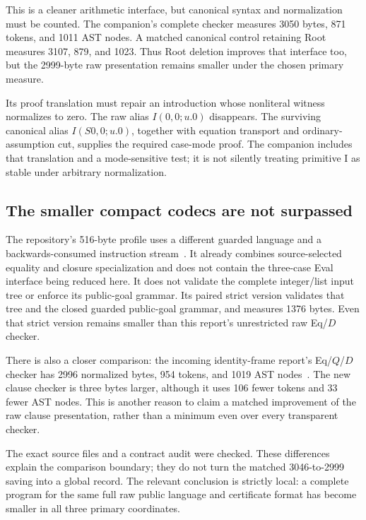 \documentclass[11pt,letterpaper]{article}
\theoremstyle{definition}
\begin{document}
This is a cleaner arithmetic interface, but canonical syntax
and normalization must be counted. The companion's complete
checker measures 3050 bytes, 871 tokens, and 1011 AST nodes.
A matched canonical control retaining Root measures 3107,
879, and 1023. Thus Root deletion improves that interface too,
but the 2999-byte raw presentation remains smaller under the
chosen primary measure.

Its proof translation must repair an introduction whose
nonliteral witness normalizes to zero. The raw alias
$I(0,0;u.0)$ disappears. The surviving canonical alias
$I(S0,0;u.0)$, together with equation transport and
ordinary-assumption cut, supplies the required case-mode proof.
The companion includes that translation and a mode-sensitive
test; it is not silently treating primitive I as stable under
arbitrary normalization.

\subsection{The smaller compact codecs are not surpassed}

The repository's 516-byte profile uses a different guarded
language and a backwards-consumed instruction stream~\cite{compact}. It
already combines source-selected equality and closure
specialization and does not contain the three-case Eval
interface being reduced here. It does not validate the complete
integer/list input tree or enforce its public-goal grammar.
Its paired strict version validates that tree and the closed
guarded public-goal grammar, and measures 1376 bytes.
Even that strict version remains smaller than this report's
unrestricted raw Eq/$D$ checker.

There is also a closer comparison: the incoming identity-frame
report's Eq/$Q$/$D$ checker has 2996 normalized bytes, 954 tokens,
and 1019 AST nodes~\cite{identity}. The new clause checker is
three bytes larger, although it uses 106 fewer tokens and 33
fewer AST nodes. This is another reason to claim a matched
improvement of the raw clause presentation, rather than a
minimum even over every transparent checker.

The exact source files and a contract audit were checked.
These differences explain the comparison boundary; they do
not turn the matched 3046-to-2999 saving into a global record.
The relevant conclusion is strictly local: a complete program
for the same full raw public language and certificate format
has become smaller in all three primary coordinates.
\end{document}
